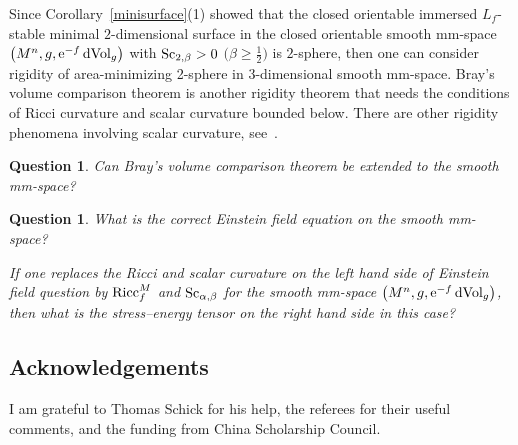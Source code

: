 \documentclass[10pt,a4paper]{amsart}
\newtheorem{Question}[Theorem]{Question}
\begin{document}
Since Corollary~\ref{minisurface}(1) showed that the closed orientable immersed $L_f$-stable minimal $2$-dimensional surface in the closed orientable smooth mm-space $\big(M^n,g, {\rm e}^{-f}\,{\rm dVol}_{g}\big)$ with ${\rm Sc}_{2, \beta}>0$ $\big(\beta\geq \frac{1}{2}\big)$ is $2$-sphere, then one can consider rigidity of area-minimizing 2-sphere
in $3$-dimensional smooth mm-space. Bray’s volume comparison theorem \cite[Chapter~3, Theorem~18]{MR2696584} is another rigidity theorem that needs the conditions of Ricci curvature and scalar curvature bounded below. There are other rigidity phenomena involving scalar curvature, see~\cite{MR3076061}.

\begin{Question}Can Bray’s volume comparison theorem be extended to the smooth mm-space?
\end{Question}

\begin{Question}What is the correct Einstein field equation on the smooth mm-space?

If one replaces the Ricci and scalar curvature on the left hand side of Einstein field question by ${\rm Ricc}^M_f$ and ${\rm Sc}_{\alpha, \beta}$ for the smooth mm-space $\big(M^n,g, {\rm e}^{-f}\,{\rm dVol}_{g}\big)$, then what is the stress–energy tensor on the right hand side in this case?
\end{Question}

\subsection*{Acknowledgements}
 I am grateful to Thomas Schick for his help, the referees for their useful comments, and the funding from China Scholarship Council.

\end{document}

